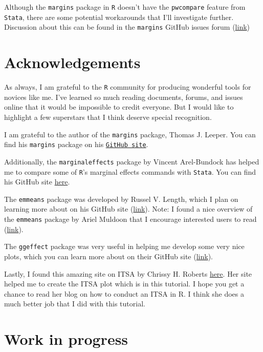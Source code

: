 \documentclass[
]{book}
\begin{document}
Although the \texttt{margins} package in \texttt{R} doesn't have the \texttt{pwcompare} feature from \texttt{Stata}, there are some potential workarounds that I'll investigate further. Discussion about this can be found in the \texttt{margins} GitHub issues forum (\href{https://github.com/leeper/margins/issues/124}{link})

\hypertarget{acknowledgements-5}{%
\section{Acknowledgements}\label{acknowledgements-5}}

As always, I am grateful to the \texttt{R} community for producing wonderful tools for novices like me. I've learned so much reading documents, forums, and issues online that it would be impossible to credit everyone. But I would like to highlight a few superstars that I think deserve special recognition.

I am grateful to the author of the \texttt{margins} package, Thomas J. Leeper. You can find his \texttt{margins} package on his \href{https://github.com/leeper/margins}{\texttt{GitHub\ site}}.

Additionally, the \texttt{marginaleffects} package by Vincent Arel-Bundock has helped me to compare some of \texttt{R}'s marginal effects commands with \texttt{Stata}. You can find his GitHub site \href{https://github.com/vincentarelbundock/marginaleffects}{here}.

The \texttt{emmeans} package was developed by Russel V. Length, which I plan on learning more about on his GitHub site (\href{https://github.com/rvlenth/emmeans}{link}). Note: I found a nice overview of the \texttt{emmeans} package by Ariel Muldoon that I encourage interested users to read (\href{https://aosmith.rbind.io/2019/03/25/getting-started-with-emmeans/}{link}).

The \texttt{ggeffect} package was very useful in helping me develop some very nice plots, which you can learn more about on their GitHub site (\href{https://strengejacke.github.io/ggeffects/}{link}).

Lastly, I found this amazing site on ITSA by Chrissy H. Roberts \href{https://rpubs.com/chrissyhroberts/1006858}{here}. Her site helped me to create the ITSA plot which is in this tutorial. I hope you get a chance to read her blog on how to conduct an ITSA in R. I think she does a much better job that I did with this tutorial.

\hypertarget{work-in-progress-2}{%
\section{Work in progress}\label{work-in-progress-2}}
\end{document}
